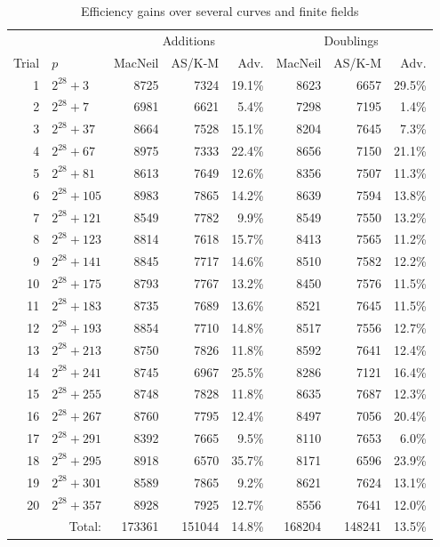 \begin{table}[h]
\caption{Efficiency gains over several curves and finite fields}
\label{tab_timing_comparison}
\begin{center}
\begin{tabular}{|r|l|rrr|rrr|}
  \hline
        &     & \multicolumn{3}{c|}{Additions} & \multicolumn{3}{c|}{Doublings} \\
  Trial & $p$ & MacNeil & AS/K-M & Adv. & MacNeil & AS/K-M & Adv. \\
  \hline
   1 & $2^{28} + 3$ & 8725 & 7324 & 19.1\% & 8623 & 6657 & 29.5\% \\
   2 & $2^{28} + 7$ & 6981 & 6621 & 5.4\% & 7298 & 7195 & 1.4\% \\
   3 & $2^{28} + 37$ & 8664 & 7528 & 15.1\% & 8204 & 7645 & 7.3\% \\
   4 & $2^{28} + 67$ & 8975 & 7333 & 22.4\% & 8656 & 7150 & 21.1\% \\
   5 & $2^{28} + 81$ & 8613 & 7649 & 12.6\% & 8356 & 7507 & 11.3\% \\
   6 & $2^{28} + 105$ & 8983 & 7865 & 14.2\% & 8639 & 7594 & 13.8\% \\
   7 & $2^{28} + 121$ & 8549 & 7782 & 9.9\% & 8549 & 7550 & 13.2\% \\
   8 & $2^{28} + 123$ & 8814 & 7618 & 15.7\% & 8413 & 7565 & 11.2\% \\
   9 & $2^{28} + 141$ & 8845 & 7717 & 14.6\% & 8510 & 7582 & 12.2\% \\
  10 & $2^{28} + 175$ & 8793 & 7767 & 13.2\% & 8450 & 7576 & 11.5\% \\
  11 & $2^{28} + 183$ & 8735 & 7689 & 13.6\% & 8521 & 7645 & 11.5\% \\
  12 & $2^{28} + 193$ & 8854 & 7710 & 14.8\% & 8517 & 7556 & 12.7\% \\
  13 & $2^{28} + 213$ & 8750 & 7826 & 11.8\% & 8592 & 7641 & 12.4\% \\
  14 & $2^{28} + 241$ & 8745 & 6967 & 25.5\% & 8286 & 7121 & 16.4\% \\
  15 & $2^{28} + 255$ & 8748 & 7828 & 11.8\% & 8635 & 7687 & 12.3\% \\
  16 & $2^{28} + 267$ & 8760 & 7795 & 12.4\% & 8497 & 7056 & 20.4\% \\
  17 & $2^{28} + 291$ & 8392 & 7665 & 9.5\% & 8110 & 7653 & 6.0\% \\
  18 & $2^{28} + 295$ & 8918 & 6570 & 35.7\% & 8171 & 6596 & 23.9\% \\
  19 & $2^{28} + 301$ & 8589 & 7865 & 9.2\% & 8621 & 7624 & 13.1\% \\
  20 & $2^{28} + 357$ & 8928 & 7925 & 12.7\% & 8556 & 7641 & 12.0\% \\
  \hline
  \multicolumn{2}{|r|}{Total:} & 173361 & 151044 & 14.8\% & 168204 & 148241 & 13.5\% \\
  \hline
\end{tabular}
\end{center}
\end{table}




